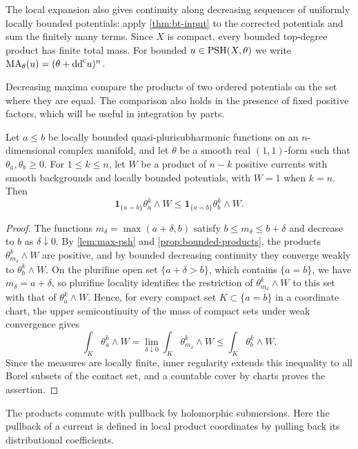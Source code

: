 The local expansion also gives continuity along decreasing sequences of uniformly locally bounded potentials: apply \cref{thm:bt-input} to the corrected potentials and sum the finitely many terms. Since $X$ is compact, every bounded top-degree product has finite total mass. For bounded $u\in\mathrm{PSH}(X,\theta)$ we write $\mathrm{MA}_\theta(u)=(\theta+\mathrm{dd}^{\mathrm{c}} u)^n$.

Decreasing maxima compare the products of two ordered potentials on the set where they are equal. The comparison also holds in the presence of fixed positive factors, which will be useful in integration by parts.

\begin{lemma}\label{lem:bounded-ordered-contact}
Let $a\leq b$ be locally bounded quasi-plurisubharmonic functions on an $n$-dimensional complex manifold, and let $\theta$ be a smooth real $(1,1)$-form such that $\theta_a,\theta_b\geq0$. For $1\leq k\leq n$, let $W$ be a product of $n-k$ positive currents with smooth backgrounds and locally bounded potentials, with $W=1$ when $k=n$. Then
\[
 \mathbf1_{\{a=b\}}\theta_a^k\wedge W
 \leq\mathbf1_{\{a=b\}}\theta_b^k\wedge W.
\]
\end{lemma}
\begin{proof}
The functions $m_\delta=\max(a+\delta,b)$ satisfy
$b\leq m_\delta\leq b+\delta$ and decrease to $b$ as $\delta\downarrow0$. By \cref{lem:max-psh} and \cref{prop:bounded-products}, the products $\theta_{m_\delta}^k\wedge W$ are positive, and by bounded decreasing continuity they converge weakly to $\theta_b^k\wedge W$. On the plurifine open set $\{a+\delta>b\}$, which contains $\{a=b\}$, we have $m_\delta=a+\delta$, so plurifine locality identifies the restriction of $\theta_{m_\delta}^k\wedge W$ to this set with that of $\theta_a^k\wedge W$. Hence, for every compact set $K\subset\{a=b\}$ in a coordinate chart, the upper semicontinuity of the mass of compact sets under weak convergence gives
\[
 \int_K\theta_a^k\wedge W
 =\lim_{\delta\downarrow0}\int_K\theta_{m_\delta}^k\wedge W
 \leq\int_K\theta_b^k\wedge W.
\]
Since the measures are locally finite, inner regularity extends this inequality to all Borel subsets of the contact set, and a countable cover by charts proves the assertion.
\end{proof}

The products commute with pullback by holomorphic submersions. Here the pullback of a current is defined in local product coordinates by pulling back its distributional coefficients.

